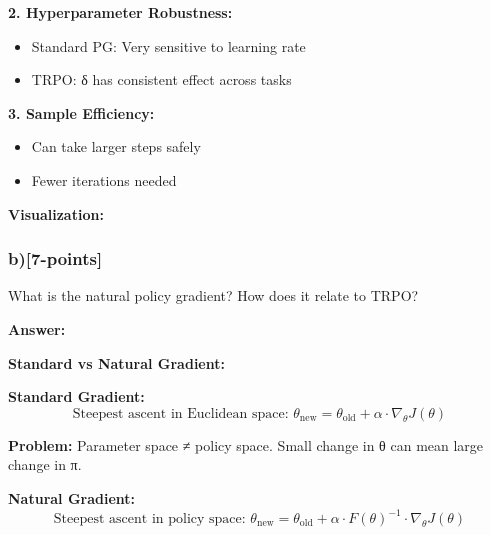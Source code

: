 \documentclass[12pt]{article}
\begin{document}
{{\textbf{2. Hyperparameter Robustness:}
\begin{itemize}
\item Standard PG: Very sensitive to learning rate
\item TRPO: δ has consistent effect across tasks
\end{itemize}

\textbf{3. Sample Efficiency:}
\begin{itemize}
\item Can take larger steps safely
\item Fewer iterations needed
\end{itemize}

\textbf{Visualization:}

\begin{center}
\end{center}

\subsubsection{b)[7-points]} What is the natural policy gradient? How does it relate to TRPO?

\textbf{Answer:}

\textbf{Standard vs Natural Gradient:}

\textbf{Standard Gradient:}
\begin{equation}
\text{Steepest ascent in Euclidean space: } \theta_{\text{new}} = \theta_{\text{old}} + \alpha \cdot \nabla_\theta J(\theta)
\end{equation}

\textbf{Problem:} Parameter space ≠ policy space. Small change in θ can mean large change in π.

\textbf{Natural Gradient:}
\begin{equation}
\text{Steepest ascent in policy space: } \theta_{\text{new}} = \theta_{\text{old}} + \alpha \cdot F(\theta)^{-1} \cdot \nabla_\theta J(\theta)
\end{equation}

}}
\end{document}
